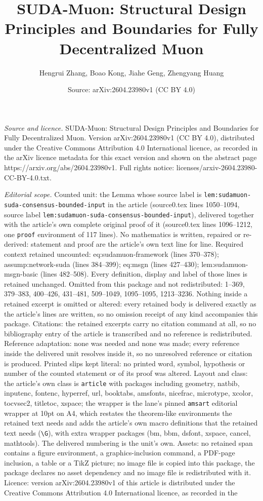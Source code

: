 \documentclass[10pt,a4paper]{amsart}
\title[SUDA-Muon: Structural Design Principles and Boundaries for F]{SUDA-Muon: Structural Design Principles and Boundaries for Fully Decentralized Muon}
\author{Hengrui Zhang, Boao Kong, Jiahe Geng, Zhengyang Huang}
\date{Source: arXiv:2604.23980v1 (CC BY 4.0)}
\begin{document}
\maketitle

\noindent\emph{Source and licence.} SUDA-Muon: Structural Design Principles and Boundaries for Fully Decentralized Muon. Version arXiv:2604.23980v1 (CC BY 4.0), distributed under the Creative Commons Attribution 4.0 International licence, as recorded in the arXiv licence metadata for this exact version and shown on the abstract page https://arxiv.org/abs/2604.23980v1. Full rights notice: licenses/arxiv-2604.23980-CC-BY-4.0.txt.\par\smallskip

\noindent\textit{Editorial scope.} Counted unit: the Lemma whose source label is \texttt{lem:sudamuon-suda-consensus-bounded-input} in the article (source0.tex lines 1050--1094, source label \texttt{lem:sudamuon-suda-consensus-bounded-input}), delivered together with the article's own complete original proof of it (source0.tex lines 1096--1212, one \texttt{proof} environment of 117 lines). No mathematics is written, repaired or re-derived: statement and proof are the article's own text line for line. Required context retained uncounted: eq:sudamuon-framework (lines 370--378); assump:network-suda (lines 384--399); eq:msgn (lines 427--430); lem:sudamuon-msgn-basic (lines 482--508). Every definition, display and label of those lines is retained unchanged. Omitted from this package and not redistributed: 1--369, 379--383, 400--426, 431--481, 509--1049, 1095--1095, 1213--3236. Nothing inside a retained excerpt is omitted or altered: every retained body is delivered exactly as the article's lines are written, so no omission receipt of any kind accompanies this package. Citations: the retained excerpts carry no citation command at all, so no bibliography entry of the article is transcribed and no reference is redistributed. Reference adaptation: none was needed and none was made; every reference inside the delivered unit resolves inside it, so no unresolved reference or citation is produced. Printed slips kept literal: no printed word, symbol, hypothesis or number of the counted statement or of its proof was altered. Layout and class: the article's own class is \texttt{article} with packages including geometry, natbib, inputenc, fontenc, hyperref, url, booktabs, amsfonts, nicefrac, microtype, xcolor, tocvsec2, titletoc, xspace; the wrapper is the lane's pinned \texttt{amsart} editorial wrapper at 10pt on A4, which restates the theorem-like environments the retained text needs and adds the article's own macro definitions that the retained text needs (\texttt{\textbackslash G}), with extra wrapper packages (bm, bbm, dsfont, xspace, cancel, mathtools). The delivered numbering is the unit's own. Assets: no retained span contains a figure environment, a graphics-inclusion command, a PDF-page inclusion, a table or a TikZ picture; no image file is copied into this package, the package declares no asset dependency and no image file is redistributed with it. Licence: version arXiv:2604.23980v1 of this article is distributed under the Creative Commons Attribution 4.0 International licence, as recorded in the 
\end{document}
